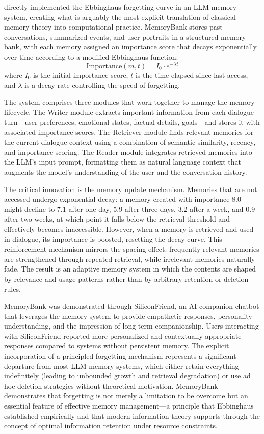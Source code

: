 \documentclass[11pt,letterpaper]{article}
\begin{document}
\cite{zhong2024memorybank} directly implemented the Ebbinghaus forgetting curve in an LLM memory system, creating what is arguably the most explicit translation of classical memory theory into computational practice. MemoryBank stores past conversations, summarized events, and user portraits in a structured memory bank, with each memory assigned an importance score that decays exponentially over time according to a modified Ebbinghaus function:
\begin{equation}
\text{Importance}(m, t) = I_0 \cdot e^{-\lambda t}
\end{equation}
where $I_0$ is the initial importance score, $t$ is the time elapsed since last access, and $\lambda$ is a decay rate controlling the speed of forgetting.

The system comprises three modules that work together to manage the memory lifecycle. The Writer module extracts important information from each dialogue turn---user preferences, emotional states, factual details, goals---and stores it with associated importance scores. The Retriever module finds relevant memories for the current dialogue context using a combination of semantic similarity, recency, and importance scoring. The Reader module integrates retrieved memories into the LLM's input prompt, formatting them as natural language context that augments the model's understanding of the user and the conversation history.

The critical innovation is the memory update mechanism. Memories that are not accessed undergo exponential decay: a memory created with importance 8.0 might decline to 7.1 after one day, 5.9 after three days, 3.2 after a week, and 0.9 after two weeks, at which point it falls below the retrieval threshold and effectively becomes inaccessible. However, when a memory is retrieved and used in dialogue, its importance is boosted, resetting the decay curve. This reinforcement mechanism mirrors the spacing effect: frequently relevant memories are strengthened through repeated retrieval, while irrelevant memories naturally fade. The result is an adaptive memory system in which the contents are shaped by relevance and usage patterns rather than by arbitrary retention or deletion rules.

MemoryBank was demonstrated through SiliconFriend, an AI companion chatbot that leverages the memory system to provide empathetic responses, personality understanding, and the impression of long-term companionship. Users interacting with SiliconFriend reported more personalized and contextually appropriate responses compared to systems without persistent memory. The explicit incorporation of a principled forgetting mechanism represents a significant departure from most LLM memory systems, which either retain everything indefinitely (leading to unbounded growth and retrieval degradation) or use ad hoc deletion strategies without theoretical motivation. MemoryBank demonstrates that forgetting is not merely a limitation to be overcome but an essential feature of effective memory management---a principle that Ebbinghaus established empirically and that modern information theory supports through the concept of optimal information retention under resource constraints.
\end{document}
